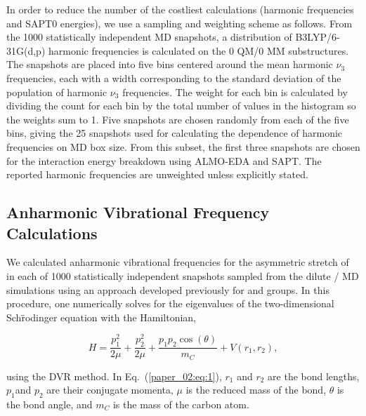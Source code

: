 In order to reduce the number of the costliest calculations (harmonic frequencies and SAPT0 energies), we use a sampling and weighting scheme as follows. From the \num{1000} statistically independent MD snapshots, a distribution of B3LYP/6-31G(d,p) harmonic frequencies is calculated on the 0 QM/0 MM substructures. The snapshots are placed into five bins centered around the mean harmonic \(\nu_{3}\) frequencies, each with a width corresponding to the standard deviation of the population of harmonic \(\nu_{3}\) frequencies. The weight for each bin is calculated by dividing the count for each bin by the total number of values in the histogram so the weights sum to \num{1}. Five snapshots are chosen randomly from each of the five bins, giving the \num{25} snapshots used for calculating the dependence of harmonic frequencies on MD box size. From this subset, the first three snapshots are chosen for the interaction energy breakdown using ALMO-EDA and SAPT. The reported harmonic frequencies are unweighted unless explicitly stated.

\subsection{Anharmonic Vibrational Frequency Calculations}
\label{paper_02:ssec:IIB}

We calculated anharmonic vibrational frequencies for the asymmetric stretch of  in each of \num{1000} statistically independent snapshots sampled from the dilute /\ce{[C4C1im][PF6]} MD simulations using an approach developed previously for  and  groups.\cite{levinson_phosphate_2011,Kinnaman2006} In this procedure, one numerically solves for the eigenvalues of the two-dimensional Schr\"{}odinger equation with the Hamiltonian,

\begin{equation}
  \label{paper_02:eq:1}
H = \frac{p_{1}^{2}}{2\mu} + \frac{p_{2}^{2}}{2\mu} + \frac{p_{1}p_{2}\cos{(\theta)}}{m_{C}} + V\left( r_{1},r_{2} \right),
\end{equation}

using the DVR method.\cite{colbert_novel_1992,seideman_quantum_1992} In Eq.~(\ref{paper_02:eq:1}), \(r_{1}\) and \(r_{2}\) are the  bond lengths, \(p_{1}\)and \(p_{2}\) are their conjugate momenta, \(\mu\) is the reduced mass of the  bond, \(\theta\) is the  bond angle, and \(m_C\) is the mass of the carbon atom.

